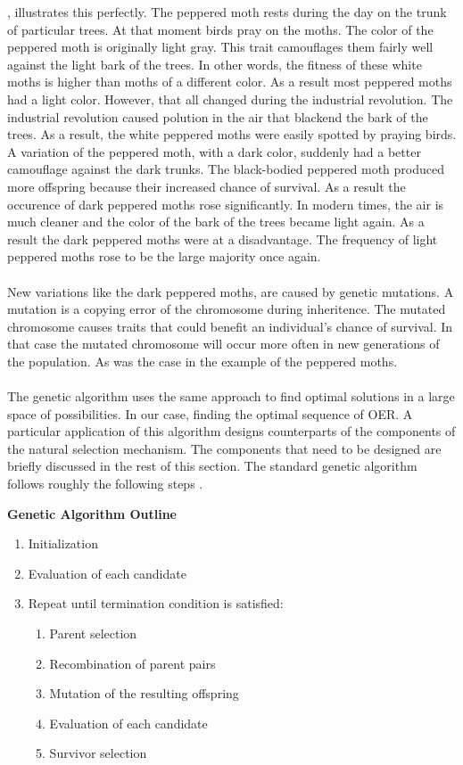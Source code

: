 \citep{Majerus2009}, illustrates this perfectly. The peppered moth rests during
the day on the trunk of particular trees. At that moment birds pray on the
moths. The color of the peppered moth is originally light gray. This trait
camouflages them fairly well against the light bark of the trees. In other
words, the fitness of these white moths is higher than moths of a different
color. As a result most peppered moths had a light color.
However, that all changed during the industrial revolution. The industrial
revolution caused polution in the air that blackend the bark of the trees. As a
result, the white peppered moths were easily spotted by praying birds. A
variation of the peppered moth, with a dark color, suddenly had a better
camouflage against the dark trunks. The black-bodied peppered moth produced
more offspring because their increased chance of survival. As a result the
occurence of dark peppered moths rose significantly.
In modern times, the air is much cleaner and the color of the bark of the trees
became light again. As a result the dark peppered moths were at a disadvantage.
The frequency of light peppered moths rose to be the large majority once
again.\\\\
\noindent
New variations like the dark peppered moths, are caused by genetic mutations. A
mutation is a copying error of the chromosome during inheritence. The
mutated chromosome causes traits that could benefit an individual's chance of
survival. In that case the mutated chromosome will occur more often in new
generations of the population. As was the case in the example of the peppered
moths.\\\\
The genetic algorithm uses the same approach to find optimal solutions in a
large space of possibilities. In our case, finding the optimal sequence of OER.
A particular application of this algorithm designs counterparts of the
components of the natural selection mechanism. The components that need to be
designed are briefly discussed in the rest of this section. The standard
genetic algorithm follows roughly the following steps \citep{Eiben2007}.
\begin{leftbar}
\smallskip
\noindent
\textbf{Genetic Algorithm Outline}
\begin{enumerate}
	\item Initialization
	\item Evaluation of each candidate
	\item Repeat until termination condition is satisfied:
		\begin{enumerate}
			\item Parent selection
			\item Recombination of parent pairs
			\item Mutation of the resulting offspring
			\item Evaluation of each candidate
			\item Survivor selection
		\end{enumerate}
\end{enumerate}
\end{leftbar}
